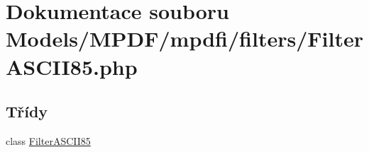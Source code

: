 \hypertarget{_filter_a_s_c_i_i85_8php}{\section{Dokumentace souboru Models/\-M\-P\-D\-F/mpdfi/filters/\-Filter\-A\-S\-C\-I\-I85.php}
\label{_filter_a_s_c_i_i85_8php}
}
\subsection*{Třídy}
\begin{DoxyCompactItemize}
\item 
class \hyperlink{class_filter_a_s_c_i_i85}{Filter\-A\-S\-C\-I\-I85}
\end{DoxyCompactItemize}
